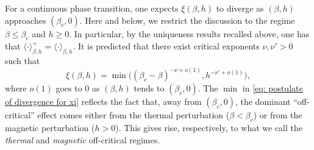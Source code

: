 \documentclass[11pt,a4paper]{article}
\numberwithin{equation}{section}
\theoremstyle{plain}
\theoremstyle{definition}
\begin{document}
For a continuous phase transition, one expects $\xi(\beta,h)$ to 
diverge as $(\beta,h)$ approaches $(\beta_c,0)$. Here and below, we restrict the discussion to the regime $\beta\leq \beta_c$ and $h\geq 0$. In particular, by the uniqueness results recalled above, one has that $\langle \cdot\rangle^+_{\beta,h}=\langle \cdot\rangle_{\beta,h}$. It is predicted that there exist critical exponents $\nu,\nu'>0$ such that
\begin{equation}\label{eq: postulate of divergence for xi}
	\xi(\beta,h)=\min\bigl( (\beta_c-\beta)^{-\nu +o(1)},h^{-\nu'+o(1)}\bigr),
\end{equation}
where $o(1)$ goes to $0$ as $(\beta,h)$ tends to $(\beta_c,0)$.
The $\min$ in \eqref{eq: postulate of divergence for xi} reflects 
the fact that, away from $(\beta_c,0)$, the dominant ``off-critical'' effect comes 
either from the thermal perturbation ($\beta<\beta_c$) or from the 
magnetic perturbation ($h>0$). This gives rise, respectively, to what we call the \emph{thermal} and 
\emph{magnetic} off-critical regimes. 
\end{document}

